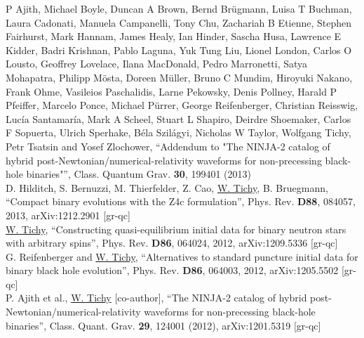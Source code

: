 \documentclass[11pt]{article}
\begin{document}
P Ajith, Michael Boyle, Duncan A Brown, Bernd Brügmann, Luisa T Buchman,
Laura Cadonati, Manuela Campanelli, Tony Chu, Zachariah B Etienne,
Stephen Fairhurst, Mark Hannam, James Healy, Ian Hinder, Sascha Husa,
Lawrence E Kidder, Badri Krishnan, Pablo Laguna, Yuk Tung Liu, Lionel London,
Carlos O Lousto, Geoffrey Lovelace, Ilana MacDonald, Pedro Marronetti,
Satya Mohapatra, Philipp Mösta, Doreen Müller, Bruno C Mundim,
Hiroyuki Nakano, Frank Ohme, Vasileios Paschalidis, Larne Pekowsky,
Denis Pollney, Harald P Pfeiffer, Marcelo Ponce, Michael Pürrer,
George Reifenberger, Christian Reisswig, Lucía Santamaría, Mark A Scheel,
Stuart L Shapiro, Deirdre Shoemaker, Carlos F Sopuerta, Ulrich Sperhake,
Béla Szilágyi, Nicholas W Taylor, Wolfgang Tichy,
Petr Tsatsin and Yosef Zlochower,
``Addendum to "The NINJA-2 catalog of hybrid
post-Newtonian/numerical-relativity waveforms for non-precessing black-hole
binaries"'',
Class. Quantum Grav. {\bf 30}, 199401 (2013)
\\

D. Hilditch, S. Bernuzzi, M. Thierfelder, Z. Cao,
\underline{W. Tichy}, B. Bruegmann,
``Compact binary evolutions with the Z4c formulation'',
Phys. Rev. {\bf D88},  084057, 2013,
arXiv:1212.2901 [gr-qc]
\\

\underline{W. Tichy},
``Constructing quasi-equilibrium initial data for binary neutron stars
with arbitrary spins'', Phys. Rev. {\bf D86}, 064024, 2012,
arXiv:1209.5336 [gr-qc]
\\

G. Reifenberger and \underline{W. Tichy},
``Alternatives to standard puncture initial data for binary black hole
evolution'', Phys. Rev. {\bf D86}, 064003, 2012,
arXiv:1205.5502 [gr-qc]
\\

P. Ajith et al., \underline{W. Tichy} [co-author],
``The NINJA-2 catalog of hybrid post-Newtonian/numerical-relativity
waveforms for non-precessing black-hole binaries'',
Class. Quant. Grav. {\bf 29}, 124001 (2012), arXiv:1201.5319 [gr-qc]
\\
\end{document}
